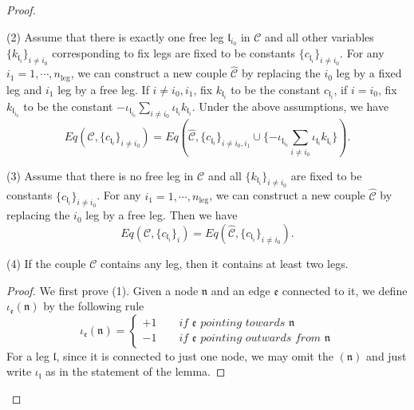 \begin{proof}
\begin{lem}
(2) Assume that there is exactly one free leg $\mathfrak{l}_{i_0}$ in $\mathcal{C}$ and all other variables $\{k_{\mathfrak{l}_{i}}\}_{i\ne i_0}$ corresponding to fix legs are fixed to be constants $\{c_{\mathfrak{l}_{i}}\}_{i\ne i_0}$. For any $i_{1}=1,\cdots,n_{\text{leg}}$, we can construct a new couple $\widehat{\mathcal{C}}$ by replacing the $i_0$ leg by a fixed leg and $i_1$ leg by a free leg. If $i\ne i_0, i_1$, fix $k_{\mathfrak{l}_{i}}$ to be the constant $c_{\mathfrak{l}_{i}}$, if $i=i_0$, fix $k_{\mathfrak{l}_{i_0}}$ to be the constant $-\iota_{\mathfrak{l}_{i_0}}\sum_{i\ne i_0} \iota_{\mathfrak{l}_i}k_{\mathfrak{l}_i}$. Under the above assumptions, we have
\begin{equation}
    Eq(\mathcal{C}, \{c_{\mathfrak{l}_{i}}\}_{i\ne i_0})=Eq\left(\widehat{\mathcal{C}}, \{c_{\mathfrak{l}_{i}}\}_{i\ne i_0, i_1}\cup \{-\iota_{\mathfrak{l}_{i_0}}\sum_{i\ne i_0} \iota_{\mathfrak{l}_i}k_{\mathfrak{l}_i}\}\right).
\end{equation}

(3) Assume that there is no free leg in $\mathcal{C}$ and all $\{k_{\mathfrak{l}_{i}}\}_{i\ne i_0}$ are fixed to be constants $\{c_{\mathfrak{l}_{i}}\}_{i\ne i_0}$. For any $i_{1}=1,\cdots,n_{\text{leg}}$, we can construct a new couple $\widehat{\mathcal{C}}$ by replacing the $i_0$ leg by a free leg. Then we have
\begin{equation}
    Eq(\mathcal{C}, \{c_{\mathfrak{l}_{i}}\}_{i})=Eq(\widehat{\mathcal{C}}, \{c_{\mathfrak{l}_{i}}\}_{i\ne i_0}).
\end{equation}

(4) If the couple $\mathcal{C}$ contains any leg, then it contains at least two legs.

\end{lem}
\begin{proof}
We first prove (1). Given a node $\mathfrak{n}$ and an edge $\mathfrak{e}$ connected to it, we define $\iota_{\mathfrak{e}}(\mathfrak{n})$ by the following rule
\begin{equation}
    \iota_{\mathfrak{e}}(\mathfrak{n})=\begin{cases}
        +1 \qquad \textit{if $\mathfrak{e}$ pointing towards $\mathfrak{n}$}
        \\
        -1 \qquad  \textit{if $\mathfrak{e}$ pointing outwards from $\mathfrak{n}$}
    \end{cases}
\end{equation}
For a leg $\mathfrak{l}$, since it is connected to just one node, we may omit the $(\mathfrak{n})$ and just write $\iota_{\mathfrak{l}}$ as in the statement of the lemma.


\end{proof}
\end{proof}
